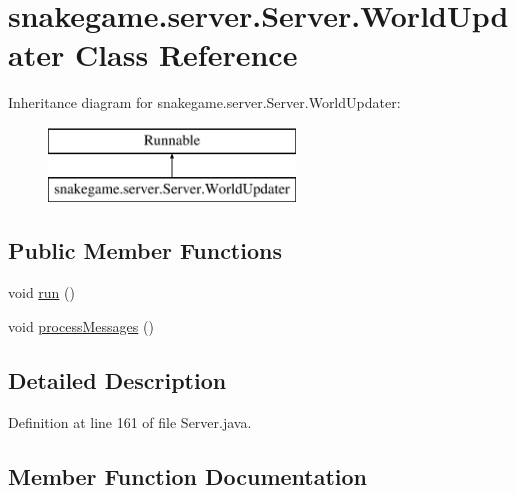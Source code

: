 \hypertarget{classsnakegame_1_1server_1_1_server_1_1_world_updater}{}\section{snakegame.\+server.\+Server.\+World\+Updater Class Reference}
\label{classsnakegame_1_1server_1_1_server_1_1_world_updater}
Inheritance diagram for snakegame.\+server.\+Server.\+World\+Updater\+:\begin{figure}[H]
\begin{center}
\leavevmode
\includegraphics[height=2.000000cm]{classsnakegame_1_1server_1_1_server_1_1_world_updater}
\end{center}
\end{figure}
\subsection*{Public Member Functions}
\begin{DoxyCompactItemize}
\item 
void \mbox{\hyperlink{classsnakegame_1_1server_1_1_server_1_1_world_updater_ab5b9d807315109ef40781908856852dd}{run}} ()
\item 
void \mbox{\hyperlink{classsnakegame_1_1server_1_1_server_1_1_world_updater_ab7308f88031d3de36fe9625235b5cfc3}{process\+Messages}} ()
\end{DoxyCompactItemize}


\subsection{Detailed Description}


Definition at line 161 of file Server.\+java.



\subsection{Member Function Documentation}
\mbox{\label{classsnakegame_1_1server_1_1_server_1_1_world_updater_ab7308f88031d3de36fe9625235b5cfc3}} 
